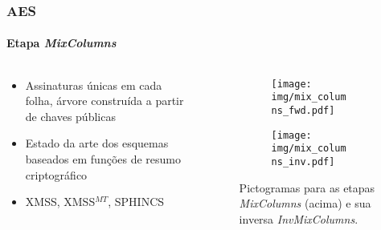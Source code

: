 \documentclass[12pt]{beamer}
\begin{document}
\begin{frame}
    \frametitle{AES}
    \framesubtitle{Etapa \emph{MixColumns}}
    \begin{columns}[T]
        \begin{column}{.7\textwidth}
          \begin{itemize}
            \item Assinaturas únicas em cada folha, árvore construída a partir de chaves públicas
            \item Estado da arte dos esquemas baseados em funções de resumo criptográfico
            \item XMSS, XMSS$^{MT}$, SPHINCS
          \end{itemize}
        \end{column}
        \begin{column}{.25\textwidth}
            \begin{figure}
            \centering
            \begin{subfigure}[b]{0.7\textwidth}
               \texttt{[image: img/mix\_columns\_fwd.pdf]}
               \vspace{2mm}
            \end{subfigure}
            
            \begin{subfigure}[b]{0.7\textwidth}
               \texttt{[image: img/mix\_columns\_inv.pdf]}
            \end{subfigure}
                    \captionsetup{font=scriptsize}
        
            \caption*{Pictogramas para as etapas \emph{MixColumns} (acima) e sua inversa \emph{InvMixColumns}.}
            \end{figure}
        \end{column}
    \end{columns}
\end{frame}
\end{document}
